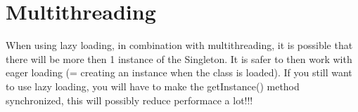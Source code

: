 \documentclass{report}
\begin{document}
			\section{Multithreading}
				When using lazy loading, in combination with multithreading, it is possible that there will be more then 1 instance of the Singleton. It is safer to then work with eager loading (= creating an instance when the class is loaded). 
				If you still want to use lazy loading, you will have to make the getInstance() method synchronized, this will possibly reduce performace a lot!!!
		
\end{document}
